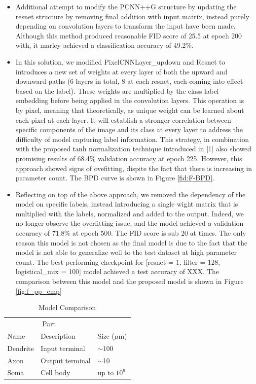 \documentclass{article}
\begin{document}
\begin{itemize}
    \item Additional attempt to modify the PCNN++G structure by updating the resnet structure by removing final addition with input matrix, instead purely depending on convolution layers to transform the input have been made. Although this method produced reasonable FID score of 25.5 at epoch 200 with, it marley achieved a classification accuracy of 49.2\%. 
    \item In this solution, we modified PixelCNNLayer\_up\/down and Resnet to introduces a new set of weights at every layer of both the upward and downward paths (6 layers in total, 8 at each resnet, each coming into effect based on the label). These weights are multiplied by the class label embedding before being applied in the convolution layers. This operation is by pixel, meaning that theoretically, as unique weight can be learned about each pixel at each layer. It will establish a stronger correlation between specific components of the image and its class at every layer to address the difficulty of model capturing label information. This strategy, in combination with the proposed tanh normalization technique introduced in [1] also showed promising results of 68.4\% validation accuracy at epoch 225. However, this approach showed signs of ovefitting, dispite the fact that there is increasing in parameter count. The BPD curve is shown in Figure \ref{fid:F-BPD}. 
    \item Reflecting on top of the above approach, we removed the dependency of the model on specific labels, instead introducing a single wight matrix that is multiplied with the labels, normalized and added to the output. Indeed, we no longer observe the overfitting issue, and the model achieved a validation accuracy of 71.8\% at epoch 500. The FID score is sub 20 at times. The only reason this model is not chosen as the final model is due to the fact that the model is not able to generalize well to the test dataset at high parameter count. The best performing checkpoint for [resnet = 1, filter = 128, logistical\_mix = 100] model achieved a test accuracy of XXX. The comparison between this model and the proposed model is shown in Figure \ref{fig:f_pp_cmp}
\end{itemize}

\begin{table}
    \caption{Model Comparison}
    \label{model_cmp}
    \centering
    \begin{tabular}{lll}
      \toprule
      \multicolumn{2}{c}{Part}                   \\
      \cmidrule(r){1-2}
      Name     & Description     & Size ($\mu$m) \\
      \midrule
      Dendrite & Input terminal  & $\sim$100     \\
      Axon     & Output terminal & $\sim$10      \\
      Soma     & Cell body       & up to $10^6$  \\
      \bottomrule
    \end{tabular}
\end{table}
\end{document}
